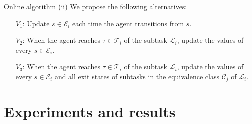 \documentclass{beamer}
\theoremstyle{mystyle}
\newcommand{\cC}{\mathcal{C}}
\newcommand{\cE}{\mathcal{E}}
\newcommand{\cL}{\mathcal{L}}
\newcommand{\cT}{\mathcal{T}}
\begin{document}
\begin{frame}{Online algorithm (ii)}
We propose the following alternatives:
\begin{itemize}
\item[$V_1$:] Update $s\in\cE_i$ each time the agent transitions from $s$.
\item[$V_2$:] When the agent reaches $\tau \in \cT_i$ of the subtask $\cL_i$, update the values of every $s \in \cE_i$.
\item[$V_3$:] When the agent reaches $\tau \in \cT_i$ of the subtask $\cL_i$, update the values of every $s \in \cE_i$ and all exit states of subtasks in the equivalence class $\cC_j$ of $\cL_i$.
\end{itemize}


    
\end{frame}



\section{Experiments and results}
%
%
%
%
%    
\end{document}
